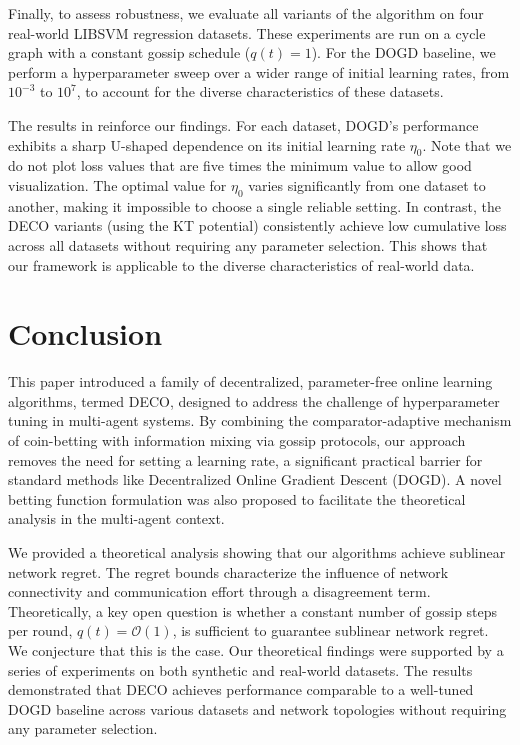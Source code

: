 \documentclass[journal]{IEEEtran} %
\newcommand{\algname}{{DECO}\xspace}
\begin{document}
Finally, to assess robustness, we evaluate all variants of the algorithm on four real-world LIBSVM regression datasets.
These experiments are run on a cycle graph with a constant gossip schedule ($q(t)=1$).
For the DOGD baseline, we perform a hyperparameter sweep over a wider range of initial learning rates, from $10^{-3}$ to $10^7$, to account for the diverse characteristics of these datasets.

The results in  reinforce our findings.
For each dataset, DOGD's performance exhibits a sharp U-shaped dependence on its initial learning rate $\eta_0$.
Note that we do not plot loss values that are five times the minimum value to allow good visualization.
The optimal value for $\eta_0$ varies significantly from one dataset to another, making it impossible to choose a single reliable setting.
In contrast, the \algname{} variants (using the KT potential) consistently achieve low cumulative loss across all datasets without requiring any parameter selection.
This shows that our framework is applicable to the diverse characteristics of real-world data.

\section{Conclusion}\label{sec:conclusion}

This paper introduced a family of decentralized, parameter-free online learning algorithms, termed \algname{}, designed to address the challenge of hyperparameter tuning in multi-agent systems.
By combining the comparator-adaptive mechanism of coin-betting with information mixing via gossip protocols, our approach removes the need for setting a learning rate, a significant practical barrier for standard methods like Decentralized Online Gradient Descent (DOGD).
A novel betting function formulation was also proposed to facilitate the theoretical analysis in the multi-agent context.

We provided a theoretical analysis showing that our algorithms achieve sublinear network regret.
The regret bounds characterize the influence of network connectivity and communication effort through a disagreement term.
Theoretically, a key open question is whether a constant number of gossip steps per round, $q(t)=\mathcal{O}(1)$, is sufficient to guarantee sublinear network regret.
We conjecture that this is the case.
Our theoretical findings were supported by a series of experiments on both synthetic and real-world datasets.
The results demonstrated that \algname{} achieves performance comparable to a well-tuned DOGD baseline across various datasets and network topologies without requiring any parameter selection.



\end{document}
